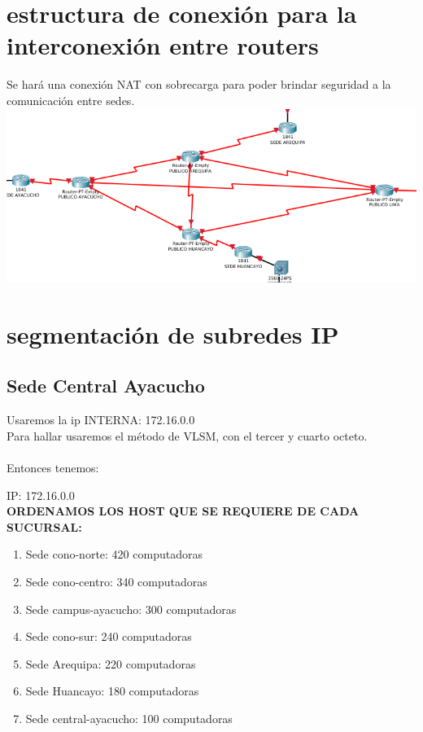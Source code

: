 \section{estructura de conexi\'on para la interconexi\'on entre routers}
Se har\'a una conexi\'on NAT con sobrecarga para poder brindar seguridad a la comunicaci\'on entre sedes.\\
\includegraphics[scale=0.55]{img/ROUTERNAT.png} 

\section{segmentaci\'on de subredes IP}

\subsection{Sede Central Ayacucho}
Usaremos la ip INTERNA: 172.16.0.0
\\
Para hallar usaremos el m\'etodo de VLSM, con el tercer y cuarto octeto. \\

\\
Entonces tenemos:

IP: 172.16.0.0
\\
\textbf{ORDENAMOS LOS HOST QUE SE REQUIERE DE CADA SUCURSAL:}
\\

\begin{definicion}[]
{
\begin{enumerate}[label=\itembolasazules{}]
\item Sede cono-norte: 420 computadoras
\item Sede cono-centro: 340 computadoras
\item Sede campus-ayacucho: 300 computadoras
\item Sede cono-sur: 240 computadoras
\item Sede Arequipa: 220 computadoras
\item Sede Huancayo: 180 computadoras
\item Sede central-ayacucho: 100 computadoras\\
\end{enumerate}
}
\end{definicion}

